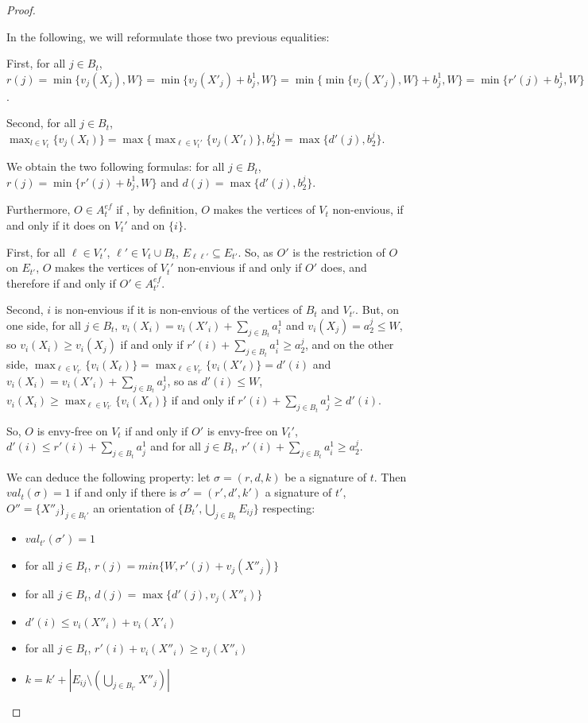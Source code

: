 \documentclass[11pt,letterpaper]{article}
\begin{document}
\begin{proof}
\begin{nestedproof}
    In the following, we will reformulate those two previous equalities:

    First, for all $j\in B_t$, $r(j)=\min\{v_{j}(X_{j}),W\}=\min\{v_{j}(X'_{j})+b_j^1,W\}=\min\{\min\{v_j(X'_j),W\}+b_j^1,W\}=\min\{r'(j)+b_j^1,W\}$.

    Second, for all $j\in B_t$, $\max_{l\in V_t}\{v_j(X_l)\}=\max\{\max_{\ell\in V_t'}\{v_j(X'_l)\},b_2^j\}=\max\{d'(j),b_2^j\}$.

    We obtain the two following formulas: for all $j\in B_t$, $r(j)=\min\{r'(j)+b_j^1,W\}$ and $d(j)=\max\{d'(j),b_2^j\}$.

    Furthermore, $O\in A_t^{ef}$ if , by definition, $O$ makes the vertices of $V_t$ non-envious, if and only if it does on $V_t'$ and on $\{i\}$.

    First, for all $\ell\in V_t'$, $\ell'\in V_t\cup B_t$, $E_{\ell\ell'}\subseteq E_{t'}$. So, as $O'$ is the restriction of $O$ on $E_{t'}$, $O$ makes the vertices of $V_t'$ non-envious if and only if $O'$ does, and therefore if and only if $O'\in A_{t'}^{ef}$.

    Second, $i$ is non-envious if it is non-envious of the vertices of $B_t$ and $V_{t'}$. But, on one side, for all $j\in B_t$, $v_i(X_i)=v_i(X'_i)+\sum_{j\in B_t}a_i^1$ and $v_i(X_j)=a_2^j\leq W$, so $v_i(X_i)\geq v_i(X_j)$ if and only if $r'(i)+\sum_{j\in B_t}a_i^1\geq a_2^j$,
    and on the other side, $\max_{\ell\in V_{t'}}\{v_i(X_\ell)\}=\max_{\ell\in V_{t'}}\{v_i(X'_\ell)\}=d'(i)$ and $v_i(X_i)= v_i(X'_i)+\sum_{j\in B_t}a_j^1$, so as $d'(i)\leq W$,  $v_i(X_i)\geq \max_{\ell\in V_{t'}}\{v_i(X_\ell)\}$ if and only if $r'(i)+\sum_{j\in B_t}a_j^1\geq d'(i)$.

    So, $O$ is envy-free on $V_t$ if and only if $O'$ is envy-free on $V_t'$, $d'(i)\leq r'(i)+\sum_{j\in B_t}a_j^1$ and for all $j\in B_t$, $r'(i)+\sum_{j\in B_t}a_i^1\geq a_2^j$.

    We can deduce the following property: let $\sigma=(r,d,k)$ be a signature of $t$. Then $val_t(\sigma)=1$ if and only if there is $\sigma'=(r',d',k')$ a signature of $t'$, $O''=\{X''_j\}_{j\in B_t'}$ an orientation of $\{B_t',\bigcup_{j\in B_t}E_{ij}\}$ respecting:
    \begin{itemize}
        \item $val_{t'}(\sigma')=1$
        \item for all $j\in B_t$, $r(j)=min\{W,r'(j)+v_j(X''_j)\}$
        \item for all $j\in B_t$, $d(j)= \max\{d'(j),v_j(X''_i)\}$
        \item $d'(i)\leq v_i(X''_i)+v_i(X'_i)$
        \item for all $j\in B_t$, $r'(i)+v_i(X''_i)\geq v_j(X''_i)$
        \item $k=k'+ |E_{ij}\setminus (\bigcup_{j\in B_{t'}}X''_j)|$
    \end{itemize}


\end{nestedproof}
\end{proof}
\end{document}
